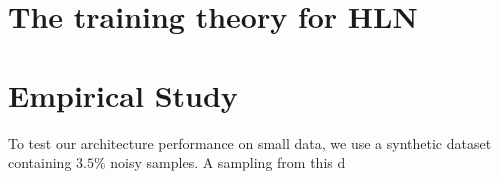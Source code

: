 \documentclass[3p,times,procedia]{elsarticle}
\begin{document}
\section{The training theory for HLN}


\section{Empirical Study}
To test our architecture performance on small data, we 
use a synthetic dataset containing $3.5\%$ noisy samples. 
A sampling from this d
\end{document}
